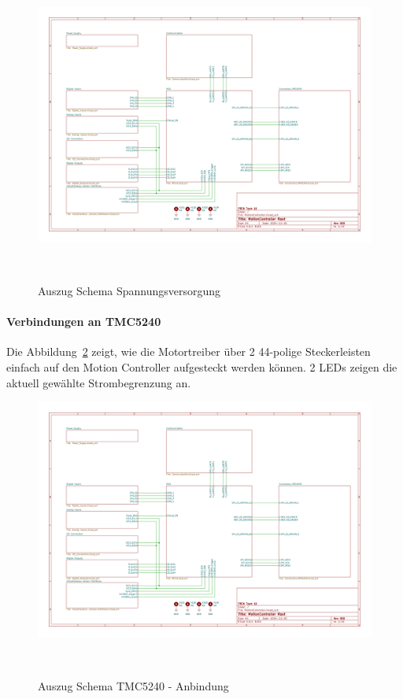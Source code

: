\documentclass[main.  tex]{subfiles} %
\begin{document}
\begin{figure}[h!]
    \centering
    \includegraphics[page=2,width=\textwidth]{../Anhang_pdfs/MotionController.pdf}
    \caption{Auszug Schema Spannungsversorgung}~\label{fig:Schema_Spannungsversorgung}
\end{figure}

\paragraph{Verbindungen an TMC5240}
Die Abbildung~\ref{fig:Schema_TMC5240} zeigt, wie die Motortreiber über 2
44-polige Steckerleisten einfach auf den Motion Controller aufgesteckt werden
können. 2 LEDs zeigen die aktuell gewählte Strombegrenzung an.

\begin{figure}[h!]
    \centering
    \includegraphics[page=3,width=\textwidth]{../Anhang_pdfs/MotionController.pdf}
    \caption{Auszug Schema TMC5240 - Anbindung}~\label{fig:Schema_TMC5240}
\end{figure}
\end{document}
